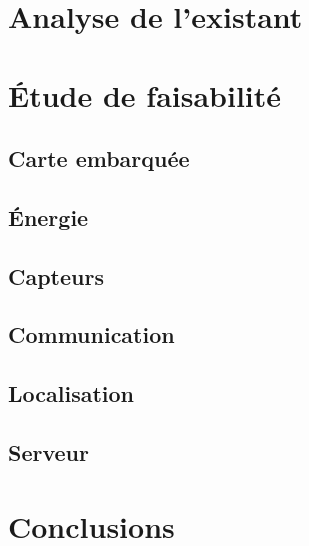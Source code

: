 \documentclass[twoside]{article}
\begin{document}
\section{Analyse de l'existant}


\section{Étude de faisabilité}

\subsection{Carte embarquée}

\subsection{Énergie}

\subsection{Capteurs}

\subsection{Communication}

\subsection{Localisation}

\subsection{Serveur}


\section{Conclusions}

\end{document}
